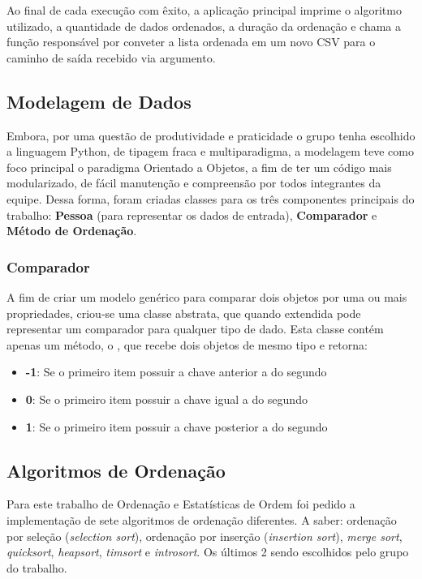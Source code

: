\documentclass[a4paper,12pt]{scrartcl}
\begin{document}
Ao final de cada execução com êxito, a aplicação principal imprime o algoritmo utilizado, a quantidade de dados ordenados, a duração da ordenação e chama a função responsável por conveter a lista ordenada em um novo CSV para o caminho de saída recebido via argumento.

\subsection{Modelagem de Dados}
Embora, por uma questão de produtividade e praticidade o grupo tenha escolhido a linguagem Python, de tipagem fraca e multiparadigma, a modelagem teve como foco principal o paradigma Orientado a Objetos, a fim de ter um código mais modularizado, de fácil manutenção e compreensão por todos integrantes da equipe. Dessa forma, foram criadas classes para os três componentes principais do trabalho: \textbf{Pessoa} (para representar os dados de entrada), \textbf{Comparador} e \textbf{Método de Ordenação}.

\subsubsection{Comparador}
A fim de criar um modelo genérico para comparar dois objetos por uma ou mais propriedades, criou-se uma classe abstrata, que quando extendida pode representar um comparador para qualquer tipo de dado. Esta classe contém apenas um método, o , que recebe dois objetos de mesmo tipo e retorna:
\begin{itemize}
    \item \textbf{-1}: Se o primeiro item possuir a chave anterior a do segundo
    \item \textbf{0}: Se o primeiro item possuir a chave igual a do segundo
    \item \textbf{1}: Se o primeiro item possuir a chave posterior a do segundo
\end{itemize}


\subsection{Algoritmos de Ordenação}
Para este trabalho de Ordenação e Estatísticas de Ordem foi pedido a implementação de sete algoritmos de ordenação diferentes.  A saber:  ordenação por seleção (\textit{selection sort}), ordenação por inserção (\textit{insertion sort}), \textit{merge sort}, \textit{quicksort}, \textit{heapsort}, \textit{timsort} e \textit{introsort}. Os últimos 2 sendo escolhidos pelo grupo do trabalho.
\end{document}
